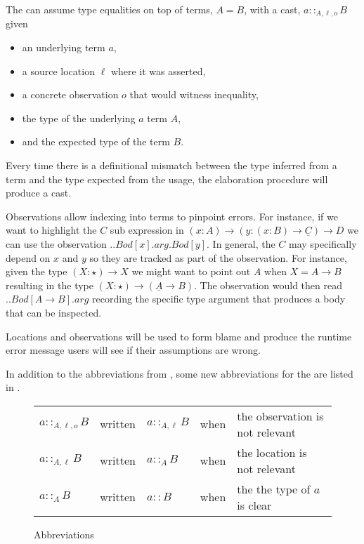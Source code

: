 The \clang{} can assume type equalities on top of terms, $A=B$, with a cast, $a::_{A,\ensuremath{\ell},o}B$ given
\begin{itemize}
\item an underlying term $a$,
\item a source location $\ell$ where it was asserted,
\item a concrete observation $o$ that would witness inequality,
\item the type of the underlying $a$ term $A$,
\item and the expected type of the term $B$.
\end{itemize}
Every time there is a definitional mismatch between the type inferred from a term and the type expected from the usage, the elaboration procedure will produce a cast.
 
Observations allow indexing into terms to pinpoint errors.
For instance, if we want to highlight the $C$ sub expression in $\left(x:A\right)\rightarrow\left(y:\left(x:B\right)\rightarrow\underline{C}\right)\rightarrow D$ we can use the observation $..Bod[x].arg.Bod[y]$.
In general, the $C$ may specifically depend on $x$ and $y$ so they are tracked as part of the observation.
For instance, given the type $\left(X:\star\right)\rightarrow X$ we might want to point out $A$ when $X=A\rightarrow B$ resulting in the type $\left(X:\star\right)\rightarrow\left(\underline{A}\rightarrow B\right)$.
The observation would then read $..Bod[A\rightarrow B].arg$ recording the specific type argument that produces a body that can be inspected.
 
Locations and observations will be used to form blame and produce the runtime error message users will see if their assumptions are wrong.
 
In addition to the abbreviations from , some new abbreviations for the \clang{} are listed in .
\begin{figure}
\begin{tabular}{lclll}
$a::_{A,\ensuremath{\ell},o}B$ & written & $a::_{A,\ensuremath{\ell}}B$ & when & the observation is not relevant\tabularnewline
$a::_{A,\ensuremath{\ell}}B$ & written & $a::_{A}B$ & when & the location is not relevant\tabularnewline
$a::_{A}B$ & written & $a::B$ & when & the the type of $a$ is clear\tabularnewline
\end{tabular}

\caption{\SLang{} Abbreviations}
\label{fig:cast-pre-syntax-abrev}
\end{figure}

